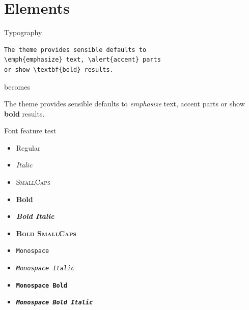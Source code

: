 \section{Elements}

\begin{frame}[fragile]{Typography}
      \begin{verbatim}The theme provides sensible defaults to
\emph{emphasize} text, \alert{accent} parts
or show \textbf{bold} results.\end{verbatim}

  \begin{center}becomes\end{center}

  The theme provides sensible defaults to \emph{emphasize} text,
  \alert{accent} parts or show \textbf{bold} results.
\end{frame}

\begin{frame}{Font feature test}
  \begin{itemize}
    \item Regular
    \item \textit{Italic}
    \item \textsc{SmallCaps}
    \item \textbf{Bold}
    \item \textbf{\textit{Bold Italic}}
    \item \textbf{\textsc{Bold SmallCaps}}
    \item \texttt{Monospace}
    \item \texttt{\textit{Monospace Italic}}
    \item \texttt{\textbf{Monospace Bold}}
    \item \texttt{\textbf{\textit{Monospace Bold Italic}}}
  \end{itemize}
\end{frame}

